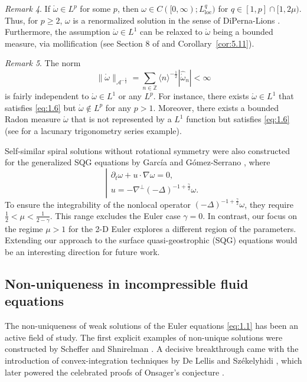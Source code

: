 \documentclass[11pt]{article}
\theoremstyle{definition}
\theoremstyle{remark}
\numberwithin{equation}{section}
\newcommand{\mbb}{\mathbb}
\newcommand{\mcal}{\mathcal}
\renewcommand{\hat}{\widehat}
\newcommand{\Z}{\mbb{Z}}
\newcommand{\del}{\partial}
\newcommand{\grad}{\nabla}
\newcommand{\norm}[1]{\lVert #1 \rVert}
\begin{document}
\noindent\textit{Remark 4}. If $\mathring{\omega}\in L^p$ for some $p$, then $\omega\in C([0,\infty); L^q_{\text{loc}})$ for $q \in [1,p] \cap [1,2\mu)$. Thus, for $p\geq 2$, $\omega$ is a renormalized solution in the sense of DiPerna-Lions \cite{DL89}. Furthermore, the assumption $\mathring{\omega} \in L^1$ can be relaxed to $\mathring{\omega}$ being a bounded measure, via mollification (see Section 8 of \cite{SWZ25} and Corollary~\ref{cor:5.11}).

\noindent\textit{Remark 5}. The norm
\begin{equation} \label{eq:1.6}
\norm{\mathring{\omega}}_{\mcal{A}^{-\frac{1}{2}}} = \sum_{n\in\Z} \langle n \rangle^{-\frac{1}{2}} |\hat{\mathring{\omega}}_n| < \infty
\end{equation}
is fairly independent to $\mathring{\omega}\in L^1$ or any $L^p$. For instance, there exists $\mathring{\omega}\in L^1$ that satisfies \eqref{eq:1.6} but $\mathring{\omega}\not\in L^p$ for any $p > 1$. Moreover, there exists a bounded Radon measure $\mathring{\omega}$ that is not represented by a $L^1$ function but satisfies \eqref{eq:1.6} (see \cite{Zyg32} for a lacunary trigonometry series example).

Self-similar spiral solutions without rotational symmetry were also constructed for the generalized SQG equations by García and Gómez-Serrano \cite{GG24}, where
\[ \left\vert \begin{array}{l} \del_t \omega + u\cdot \grad \omega = 0, \\ u = -\grad^\perp (-\Delta)^{-1 + \frac{\gamma}{2}} \omega. \end{array} \right. \]
To ensure the integrability of the nonlocal operator $(-\Delta)^{-1 + \frac{\gamma}{2}} \omega$, they require $\frac{1}{2} < \mu < \frac{1}{2 - \gamma}$. This range excludes the Euler case $\gamma = 0$. In contrast, our focus on the regime $\mu > 1$ for the 2-D Euler explores a different region of the parameters. Extending our approach to the surface quasi-geostrophic (SQG) equations would be an interesting direction for future work.

\subsection{Non-uniqueness in incompressible fluid equations} \label{subsec:1.2}

The non-uniqueness of weak solutions of the Euler equations \eqref{eq:1.1} has been an active field of study. The first explicit examples of non-unique solutions were constructed by Scheffer and Shnirelman \cite{Sch93, Shn97}. A decisive breakthrough came with the introduction of convex-integration techniques by De Lellis and Székelyhidi \cite{DS09}, which later powered the celebrated proofs of Onsager’s conjecture \cite{Ise18, GR24}.
\end{document}
